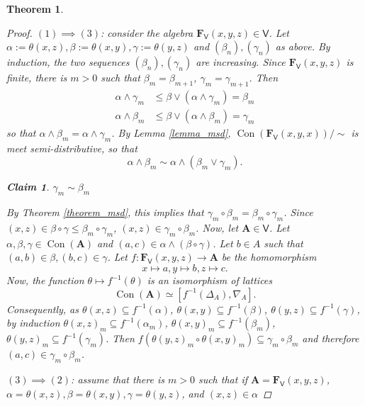 \documentclass{amsart}
\theoremstyle{plain}
\newtheorem{theorem}{Theorem}[section]
\newtheorem{claim}{Claim}
\theoremstyle{definition}
\theoremstyle{remark}
\DeclareMathOperator{\Con}{Con}
\begin{document}
\begin{theorem}
\begin{proof}
        $(1) \implies (3)$: consider the algebra $\mathbf{F}_{\mathsf{V}}(x,y,z) \in \mathsf{V}$. 
        Let $\alpha:=\theta(x,z), \beta:=\theta(x,y), \gamma:=\theta(y,z)$ and $(\beta_n), (\gamma_n)$ as above. 
        By induction, the two sequences $(\beta_n), (\gamma_n)$ are increasing. 
        Since $\mathbf{F}_{\mathsf{V}}(x,y,z)$ is finite, there is $m > 0$ such that $\beta_m = \beta_{m+1}$, $\gamma_m = \gamma_{m+1}$. 
        Then 
        \begin{align*}
            \alpha \land \gamma_m & \le \beta \lor (\alpha \land \gamma_m) = \beta_m \\
            \alpha \land \beta_m & \le \beta \lor (\alpha \land \beta_m) = \gamma_m
        \end{align*}
        so that $\alpha \land \beta_m = \alpha \land \gamma_m$. 
        By Lemma \ref{lemma_msd}, $\Con(\mathbf{F}_{\mathsf{V}}(x,y,x))/ \sim$ is meet semi-distributive, so that 
        \begin{equation*}
            \alpha \land \beta_m \sim \alpha \land (\beta_m \lor \gamma_m) \text{.}
        \end{equation*}
        \begin{claim}
            $\gamma_m \sim \beta_m$ 
        \end{claim}
        By Theorem \ref{theorem_msd}, this implies that $\gamma_m \circ \beta_m = \beta_m \circ \gamma_m$. 
        Since $(x,z) \in \beta \circ \gamma \le \beta_m \circ \gamma_m$, $(x,z) \in \gamma_m \circ \beta_m$.
        Now, let $\mathbf{A} \in \mathsf{V}$. 
        Let $\alpha, \beta, \gamma \in \Con(\mathbf{A})$ and $(a,c) \in \alpha \land (\beta \circ \gamma)$. 
        Let $b \in A$ such that $(a,b) \in \beta, (b,c) \in \gamma$. 
        Let $f: \mathbf{F}_{\mathsf{V}}(x,y,z) \to \mathbf{A}$ be the homomorphism
        \begin{equation*}
            x \mapsto a, y \mapsto b, z \mapsto c \text{.}
        \end{equation*} 
        Now, the function $\theta \mapsto f^{-1}(\theta)$ is an isomorphism of lattices 
        \begin{equation*}
            \Con(\mathbf{A}) \simeq [f^{-1}(\Delta_A), \nabla_A] \text{.}
        \end{equation*}
        Consequently, as $\theta(x,z) \subseteq f^{-1}(\alpha)$, $\theta(x,y) \subseteq f^{-1}(\beta)$, $\theta(y,z) \subseteq f^{-1}(\gamma)$, by induction  
        $\theta(x,z)_m \subseteq f^{-1}(\alpha_m)$, $\theta(x,y)_m \subseteq f^{-1}(\beta_m)$, $\theta(y,z)_m \subseteq f^{-1}(\gamma_m)$.
        Then $f(\theta(y,z)_m \circ \theta(x,y)_m) \subseteq \gamma_m \circ \beta_m$ and therefore $(a,c) \in \gamma_m \circ \beta_m$. 

        $(3) \implies (2)$: assume that there is $m>0$ such that if $\mathbf{A}=\mathbf{F}_{\mathsf{V}}(x,y,z)$, $\alpha=\theta(x,z), \beta=\theta(x,y), \gamma=\theta(y,z)$, 
        and $(x,z) \in \alpha $
    \end{proof}
\end{theorem}
\end{document}
